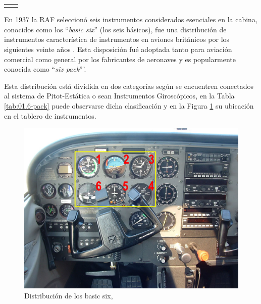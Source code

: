 \begin{longtable}{m{}m{}}
{}
\\

  \end{longtable}


En 1937 la \ac{RAF} seleccion\'o seis instrumentos considerados esenciales en la cabina, conocidos como los ``\emph{basic six}'' (los seis b\'asicos), fue una distribuci\'on de instrumentos caracter\'istica de instrumentos en aviones brit\'anicos por los siguientes veinte a\~nos \cite{RAF_37}. Esta disposici\'on fu\'e adoptada tanto para aviaci\'on comercial como general por los fabricantes de aeronaves y es popularmente conocida como ``\emph{six pack}'''.
 
Esta distribuci\'on est\'a dividida en dos categor\'ias seg\'un se encuentren conectados al sistema de Pitot-Est\'atica o sean  Instrumentos Girosc\'opicos, en la Tabla \ref{tab:01.6-pack} puede observarse dicha clasificaci\'on y en la Figura \ref{fig:01-6-pack} su ubicaci\'on en el tablero de instrumentos.

\begin{figure}[!htb]
  \centering
  \includegraphics[width=0.8\linewidth]{01.tablero.instrumentos/imagenes/1.3.distribucion.normalizada.instrumental.en.tablero/01-Cessna-172-Instrument-Panel.jpg}
  \caption{Distribuci\'on de los basic six, \protect\cite{6-pack}}
  \label{fig:01-6-pack}
\end{figure}


